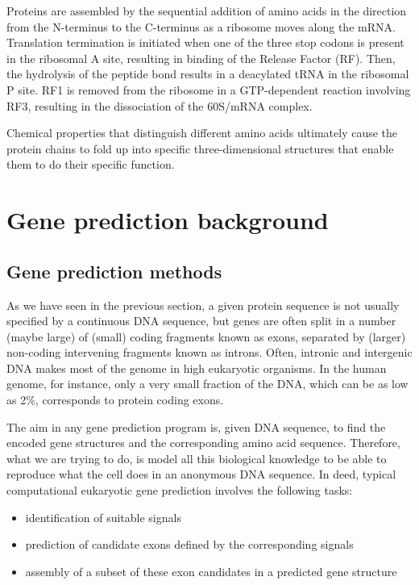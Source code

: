 Proteins are assembled by the sequential addition of amino acids in
the direction from the N-terminus to the C-terminus as a ribosome
moves along the mRNA. Translation termination is initiated when one of
the three stop codons is present in the ribosomal A site, resulting in
binding of the Release Factor (RF). Then, the hydrolysis of the
peptide bond results in a deacylated tRNA in the ribosomal P site. RF1
is removed from the ribosome in a GTP-dependent reaction involving
RF3, resulting in the dissociation of the 60S/mRNA complex.

Chemical properties that distinguish different amino acids ultimately
cause the protein chains to fold up into specific three-dimensional
structures that enable them to do their specific function.

\section{Gene prediction background}

\subsection{Gene prediction methods}

As we have seen in the previous section, a given protein sequence is
not usually specified by a continuous DNA sequence, but genes are
often split in a number (maybe large) of (small) coding fragments
known as exons, separated by (larger) non-coding intervening fragments
known as introns. Often, intronic and intergenic DNA makes most of the
genome in high eukaryotic organisms. In the human genome, for
instance, only a very small fraction of the DNA, which can be as low
as 2\%, corresponds to protein coding exons.

The aim in any gene prediction program is, given DNA sequence, to find
the encoded gene structures and the corresponding amino acid
sequence. Therefore, what we are trying to do, is model all this
biological knowledge to be able to reproduce what the cell does in an
anonymous DNA sequence. In deed, typical computational eukaryotic gene
prediction involves the following tasks:

\begin{itemize}
\item identification of suitable signals
\item prediction of candidate exons defined by the corresponding signals
\item assembly of a subset of these exon candidates in a predicted gene structure
\end{itemize}

